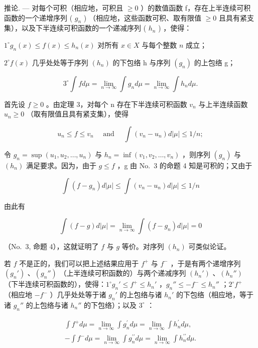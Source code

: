 推论. --- 对每个可积（相应地，可积且 \(\geqslant0\) ）的数值函数 f，存在上半连续可积函数的一个递增序列 ( \(g_{n}\) ) （相应地，这些函数可积、取有限值 \(\geqslant0\) 且具有紧支集），以及下半连续可积函数的一个递减序列 ( \(h_{n}\) ) ，使得：

\(1^{\circ} g_{n}(x) \leqslant f(x) \leqslant h_{n}(x)\) 对所有 \(x \in X\) 与每个整数 \(n\) 成立；

\(2^{\circ} f(x)\) 几乎处处等于序列 \((h_{n})\) 的下包络 h 与序列 \((g_{n})\) 的上包络 g；

\[
3 ^ {\circ} \int f d \mu = \lim _ {n \rightarrow \infty} \int g _ {n} d \mu = \lim _ {n \rightarrow \infty} \int h _ {n} d \mu .
\]

首先设 \(f \geqslant 0\) 。由定理 3，对每个 n 存在下半连续可积函数 \(v_{n}\) 与上半连续函数 \(u_{n} \geqslant 0\) （取有限值且具有紧支集），使得

\[
u _ {n} \leqslant f \leqslant v _ {n} \quad \text { and } \quad \int (v _ {n} - u _ {n}) d | \mu | \leqslant 1 / n;
\]

令 \(g_{n} = \sup(u_{1}, u_{2}, \ldots, u_{n})\) 与 \(h_{n} = \inf(v_{1}, v_{2}, \ldots, v_{n})\) ，则序列 \((g_{n})\) 与 \((h_{n})\) 满足要求。因为，由于 \(g \leqslant f\) ，g 由 No.~3 的命题 4 知是可积的；又由于

\[
\int (f - g _ {n}) d | \mu | \leqslant \int (v _ {n} - u _ {n}) d | \mu | \leqslant 1 / n
\]

由此有

\[
\int (f - g) d | \mu | = \lim _ {n \rightarrow \infty} \int (f - g _ {n}) d | \mu | = 0
\]

（No.~3, 命题 4），这就证明了 \(f\) 与 \(g\) 等价。对序列 \((h_n)\) 可类似论证。

若 \(f\) 不是正的，我们可以把上述结果应用于 \(f^{+}\) 与 \(f^{-}\) ，于是有两个递增序列 \((g_n')\) 、\((g_n'')\) （上半连续可积函数的）与两个递减序列 \((h_n')\) 、\((h_n'')\) （下半连续可积函数的），使得：\(1^\circ g_n' \leqslant f^{+} \leqslant h_n'\) ，\(g_n'' \leqslant -f^{-} \leqslant h_n''\) ；\(2^\circ f^{+}\) （相应地 \(-f^{-}\) ）几乎处处等于诸 \(g_n'\) 的上包络与诸 \(h_n'\) 的下包络（相应地，等于诸 \(g_n''\) 的上包络与诸 \(h_n''\) 的下包络）；以及 \(3^\circ\) ：

\[
\begin{array}{r} \int f ^ {+} d \mu = \lim _ {n \to \infty} \int g _ {n} ^ {\prime} d \mu = \lim _ {n \to \infty} \int h _ {n} ^ {\prime} d \mu , \\ - \int f ^ {-} d \mu = \lim _ {n \to \infty} \int g _ {n} ^ {\prime \prime} d \mu = \lim _ {n \to \infty} \int h _ {n} ^ {\prime \prime} d \mu . \end{array}
\]

